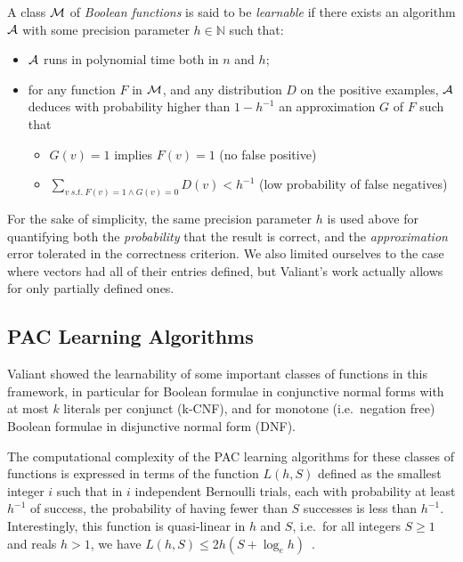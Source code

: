 \documentclass{llncs}
\begin{document}
\begin{definition}\label{def:learnclass}
   A class $\cal M$ of \emph{Boolean functions} is said to be \emph{learnable}
   if there exists an algorithm $\cal A$ with some precision parameter $h\in\mathbb N$ such that:
   \begin{itemize}
      \item $\cal A$ runs in polynomial time both in $n$ and $h$;
      \item
         for any function $F$ in $\cal M$, and any distribution $D$ on the positive examples,
         $\cal A$ deduces with probability higher than $1-h^{-1}$ an approximation $G$ of $F$ such that
         \begin{itemize}
            \item $G(v)=1$ implies $F(v)=1$ (no false positive)
            \item
               $\displaystyle\sum_{v\ s.t.\ F(v)=1\wedge G(v)=0} D(v) < h^{-1}$ (low probability of false negatives)
         \end{itemize}
   \end{itemize}
\end{definition}

For the sake of simplicity, the same precision parameter $h$ is used above for quantifying both the \emph{probability} that the result is correct,
and the \emph{approximation} error tolerated in the correctness criterion.
We also limited ourselves to the case where vectors had all of their entries defined, but Valiant's work actually allows for only partially defined ones.


\subsection{PAC Learning Algorithms}

Valiant showed the learnability of some important classes of functions in this framework,
in particular for Boolean formulae in conjunctive normal forms with at most $k$ literals per conjunct (k-CNF),
and for monotone (i.e.~negation free) Boolean formulae in disjunctive normal form (DNF).

The computational complexity of the PAC learning algorithms for these classes of functions is expressed in terms of the function
$L(h,S)$ defined as the smallest integer $i$ such that
in $i$ independent Bernoulli trials, each with probability at least $h^{-1}$ of success, the probability of having fewer than $S$ successes is less than $h^{-1}$.
Interestingly, this function is quasi-linear in $h$ and $S$, i.e.~for all
integers $S\ge 1$ and reals $h>1$, we have $L(h,S) \le 2h(S+\log_e h)$~\cite{Valiant84cacm}.
\end{document}

